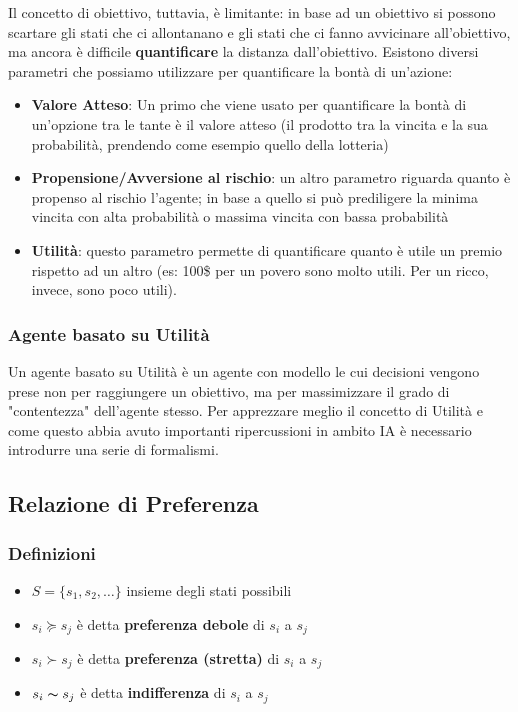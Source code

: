 Il concetto di obiettivo, tuttavia, è limitante: in base ad un obiettivo si possono scartare gli stati che ci allontanano e gli stati che ci fanno avvicinare all'obiettivo, ma ancora è difficile \textbf{quantificare} la distanza dall'obiettivo.
Esistono diversi parametri che possiamo utilizzare per quantificare la bontà di un'azione:
\begin{itemize}
    \item \textbf{Valore Atteso}: Un primo che viene usato per quantificare la bontà di un'opzione tra le tante è il valore atteso (il prodotto tra la vincita e la sua probabilità, prendendo come esempio quello della lotteria)
    \item \textbf{Propensione/Avversione al rischio}: un altro parametro riguarda quanto è propenso al rischio l'agente; in base a quello si può prediligere la minima vincita con alta probabilità o massima vincita con bassa probabilità
    \item \textbf{Utilità}: questo parametro permette di quantificare quanto è utile un premio rispetto ad un altro (es: 100\$ per un povero sono molto utili. Per un ricco, invece, sono poco utili).
\end{itemize}


\subsubsection{Agente basato su Utilità}
Un agente basato su Utilità è un agente con modello le cui decisioni vengono prese non per raggiungere un obiettivo, ma per massimizzare il grado di "contentezza" dell'agente stesso.
Per apprezzare meglio il concetto di Utilità e come questo abbia avuto importanti ripercussioni in ambito IA è necessario introdurre una serie di formalismi.

\subsection{Relazione di Preferenza}
\subsubsection{Definizioni}
\begin{itemize}
    \item $\displaystyle S = \{s_1, s_2, \dots\}$ insieme degli stati possibili
    \item $\displaystyle s_i \succeq s_j $ è detta \textbf{preferenza debole} di $s_i$ a $s_j$
    \item $\displaystyle s_i \succ s_j$ è detta \textbf{preferenza (stretta)} di $s_i$ a $s_j$
    \item $\displaystyle s_i \thicksim  s_j$ è detta \textbf{indifferenza} di $s_i$ a $s_j$
\end{itemize}

